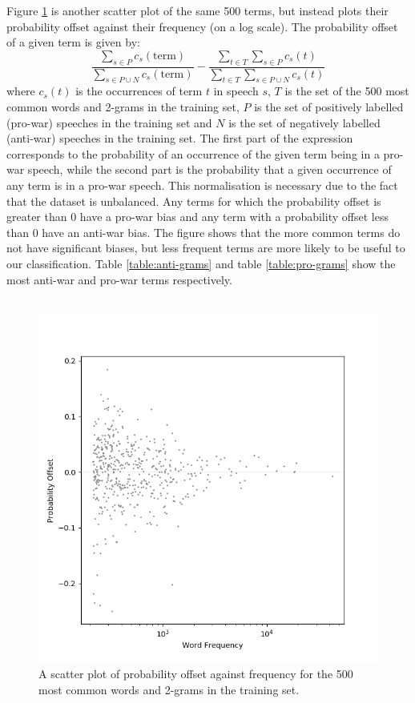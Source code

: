 \documentclass[12pt,a4paper,twoside,openright]{report}
\begin{document}
Figure \ref{fig:ngramoffset} is another scatter plot of the same 500 terms, but instead plots their probability offset against their frequency (on a log scale). The probability offset of a given term is given by:
\begin{equation}
	\frac{\sum_{s \in P}c_{s}(\text{term})}{\sum_{s \in P \cup N}c_{s}(\text{term})} - \frac{\sum_{t \in T}\sum_{s \in P}c_{s}(t)}{\sum_{t \in T}\sum_{s \in P \cup N}c_{s}(t)}
\end{equation}
where $c_{s}(t)$ is the occurrences of term $t$ in speech $s$, $T$ is the set of the 500 most common words and 2-grams in the training set, $P$ is the set of positively labelled (pro-war) speeches in the training set and $N$ is the set of negatively labelled (anti-war) speeches in the training set. The first part of the expression corresponds to the probability of an occurrence of the given term being in a pro-war speech, while the second part is the probability that a given occurrence of any term is in a pro-war speech. This normalisation is necessary due to the fact that the dataset is unbalanced. Any terms for which the probability offset is greater than 0 have a pro-war bias and any term with a probability offset less than 0 have an anti-war bias. The figure shows that the more common terms do not have significant biases, but less frequent terms are more likely to be useful to our classification. Table \ref{table:anti-grams} and table \ref{table:pro-grams} show the most anti-war and pro-war terms respectively.
\\\\
\begin{figure}
	\begin{center}
		\includegraphics[scale=0.8]{figs/ngramoffset.png}
	\end{center}
	\caption{A scatter plot of probability offset against frequency for the 500 most common words and 2-grams in the training set.}
	\label{fig:ngramoffset}
\end{figure} 
\end{document}
